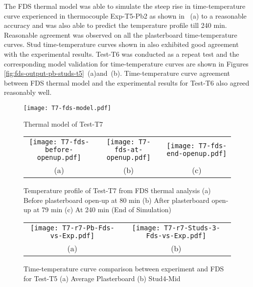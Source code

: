 The FDS thermal model was able to simulate the steep rise in time-temperature curve experienced in thermocouple Exp-T5-Pb2 as shown in ~(a) to a reasonable accuracy and was also able to predict the temperature profile till 240 min. Reasonable agreement was observed on all the plasterboard time-temperature curves. Stud time-temperature curves shown in  also exhibited good agreement with the experimental results. Test-T6 was conducted as a repeat test and the corresponding model validation for time-temperature curves are shown in Figures \ref{fig:fds-output-pb-studs-t5}~(a)and~(b). Time-temperature curve agreement between FDS thermal model and the experimental results for Test-T6 also agreed reasonably well.
\begin{figure}[!htbp]
	\centering
		\texttt{[image: T7-fds-model.pdf]}
		\caption{Thermal model of Test-T7}
		\label{fig:T7-fds-model-cavity}
\end{figure}
\begin{figure}[!htbp]
	\begin{center}
		\begin{tabular}{ccc}
			\texttt{[image: T7-fds-before-openup.pdf]} &
			\texttt{[image: T7-fds-at-openup.pdf]} &
			\texttt{[image: T7-fds-end-openup.pdf]}\\
			(a) & (b)& (c)\\
		\end{tabular} 
		\caption{Temperature profile of Test-T7 from FDS thermal analysis (a) Before plasterboard open-up at 80 min (b) After plasterboard open-up at 79 min (c) At 240 min (End of Simulation)}
		\label{fig:T7-fds-output}
	\end{center}
\end{figure}
\begin{figure}[!htbp]
	\centering
		\begin{tabular}{cc}
			\texttt{[image: T7-r7-Pb-Fds-vs-Exp.pdf]} & \texttt{[image: T7-r7-Studs-3-Fds-vs-Exp.pdf]} \\
			(a) & (b) \\
		\end{tabular} 
		\caption{Time-temperature curve comparison between experiment and FDS for Test-T5 (a) Average Plasterboard (b) Stud4-Mid}
		\label{fig:fds-output-pb-studs-t7}
\end{figure}

